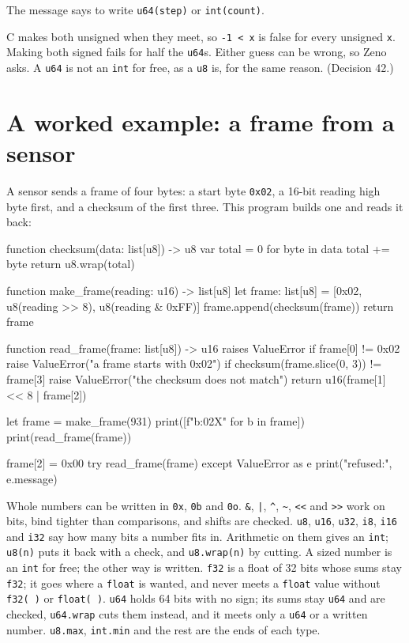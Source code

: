 The message says to write \verb|u64(step)| or \verb|int(count)|.

\begin{why}
C makes both unsigned when they meet, so \verb|-1 < x| is false for
every unsigned \verb|x|. Making both signed fails for half the
\verb|u64|s. Either guess can be wrong, so Zeno asks. A \verb|u64|
is not an \verb|int| for free, as a \verb|u8| is, for the same
reason. (Decision 42.)
\end{why}

\section{A worked example: a frame from a sensor}

A sensor sends a frame of four bytes: a start byte \verb|0x02|, a
16-bit reading high byte first, and a checksum of the first three.
This program builds one and reads it back:

\begin{zeno}[file=frame.zeno]
function checksum(data: list[u8]) -> u8 {
    var total = 0
    for byte in data {
        total += byte
    }
    return u8.wrap(total)
}

function make_frame(reading: u16) -> list[u8] {
    let frame: list[u8] = [0x02, u8(reading >> 8), u8(reading & 0xFF)]
    frame.append(checksum(frame))
    return frame
}

function read_frame(frame: list[u8]) -> u16 raises ValueError {
    if frame[0] != 0x02 {
        raise ValueError("a frame starts with 0x02")
    }
    if checksum(frame.slice(0, 3)) != frame[3] {
        raise ValueError("the checksum does not match")
    }
    return u16(frame[1] << 8 | frame[2])
}

let frame = make_frame(931)
print([f"{b:02X}" for b in frame])
print(read_frame(frame))

frame[2] = 0x00
try {
    read_frame(frame)
} except ValueError as e {
    print("refused:", e.message)
}
\end{zeno}

\begin{summary}
Whole numbers can be written in \verb|0x|, \verb|0b| and \verb|0o|.
\verb|&|, \verb!|!, \verb|^|, \verb|~|, \verb|<<| and \verb|>>| work
on bits, bind tighter than comparisons, and shifts are checked.
\verb|u8|, \verb|u16|, \verb|u32|, \verb|i8|, \verb|i16| and
\verb|i32| say how many bits a number fits in. Arithmetic on them gives
an \verb|int|; \verb|u8(n)| puts it back with a check, and
\verb|u8.wrap(n)| by cutting. A sized number is an \verb|int| for free;
the other way is written. \verb|f32| is a float of 32 bits whose sums
stay \verb|f32|; it goes where a \verb|float| is wanted, and never
meets a \verb|float| value without \verb|f32( )| or \verb|float( )|.
\verb|u64| holds 64 bits with no sign; its sums stay \verb|u64| and
are checked, \verb|u64.wrap| cuts them instead, and it meets only a
\verb|u64| or a written number. \verb|u8.max|, \verb|int.min| and
the rest are the ends of each type.
\end{summary}

